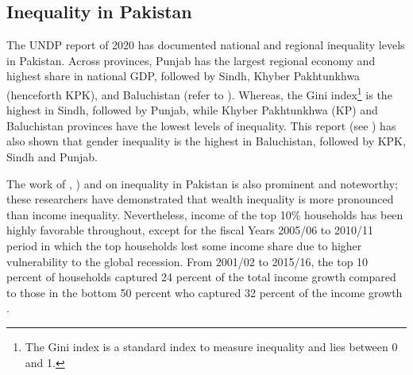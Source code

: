 \documentclass[12pt]{article}
\newcommand{\1}{\mathbbm 1}
\begin{document}
	
	 
	
	


\subsection{Inequality in Pakistan}

	
	The UNDP report of 2020 has documented national and regional inequality levels in Pakistan. Across provinces, Punjab has the largest regional economy and highest share in national GDP, followed by Sindh, Khyber Pakhtunkhwa (henceforth KPK), and Baluchistan (refer to \cite{hafizpasha2020}). Whereas, the Gini index\footnote{The Gini index is a standard index to measure inequality and lies between 0 and 1.} is the highest in Sindh, followed by Punjab, while Khyber Pakhtunkhwa (KP) and Baluchistan provinces have the lowest levels of inequality. This report (see \cite{hafizpasha2020}) has also shown that gender inequality is the highest in Baluchistan, followed by KPK, Sindh and Punjab.
	
	 The work of \cite{burki2015multiple}, \cite{burki2020exploring}) and \cite{burki2021LUMS} on inequality in Pakistan is also prominent and noteworthy; these researchers have demonstrated that wealth inequality is more pronounced than income inequality. Nevertheless, income of the top 10\% households has been highly favorable throughout, except for the fiscal Years 2005/06 to 2010/11 period in which the top households lost some income share due to higher vulnerability to the global recession. From 2001/02 to 2015/16, the top 10 percent of households captured 24 percent of the total income growth compared to those in the bottom 50 percent who captured 32 percent of the income growth \cite{burki2021LUMS}. 
	 
\end{document}
